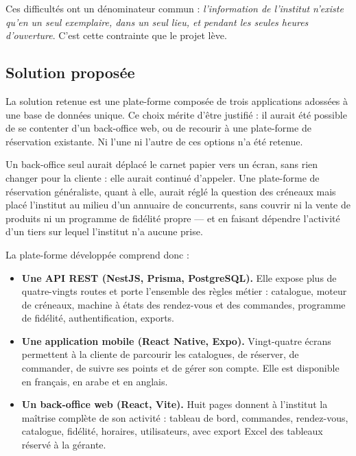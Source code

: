 Ces difficultés ont un dénominateur commun : \emph{l'information de l'institut
n'existe qu'en un seul exemplaire, dans un seul lieu, et pendant les seules
heures d'ouverture}. C'est cette contrainte que le projet lève.

\subsection{Solution proposée}

La solution retenue est une plate-forme composée de trois applications adossées
à une base de données unique. Ce choix mérite d'être justifié : il aurait été
possible de se contenter d'un back-office web, ou de recourir à une plate-forme
de réservation existante. Ni l'une ni l'autre de ces options n'a été retenue.

Un back-office seul aurait déplacé le carnet papier vers un écran, sans rien
changer pour la cliente : elle aurait continué d'appeler. Une plate-forme de
réservation généraliste, quant à elle, aurait réglé la question des créneaux
mais placé l'institut au milieu d'un annuaire de concurrents, sans couvrir ni
la vente de produits ni un programme de fidélité propre --- et en faisant
dépendre l'activité d'un tiers sur lequel l'institut n'a aucune prise.

La plate-forme développée comprend donc :

\begin{itemize}[leftmargin=1.2cm]
  \item \textbf{Une API REST (NestJS, Prisma, PostgreSQL).} Elle expose plus de
  quatre-vingts routes et porte l'ensemble des règles métier : catalogue,
  moteur de créneaux, machine à états des rendez-vous et des commandes,
  programme de fidélité, authentification, exports.

  \item \textbf{Une application mobile (React Native, Expo).} Vingt-quatre
  écrans permettent à la cliente de parcourir les catalogues, de réserver, de
  commander, de suivre ses points et de gérer son compte. Elle est disponible
  en français, en arabe et en anglais.

  \item \textbf{Un back-office web (React, Vite).} Huit pages donnent à
  l'institut la maîtrise complète de son activité : tableau de bord,
  commandes, rendez-vous, catalogue, fidélité, horaires, utilisateurs, avec
  export Excel des tableaux réservé à la gérante.
\end{itemize}

